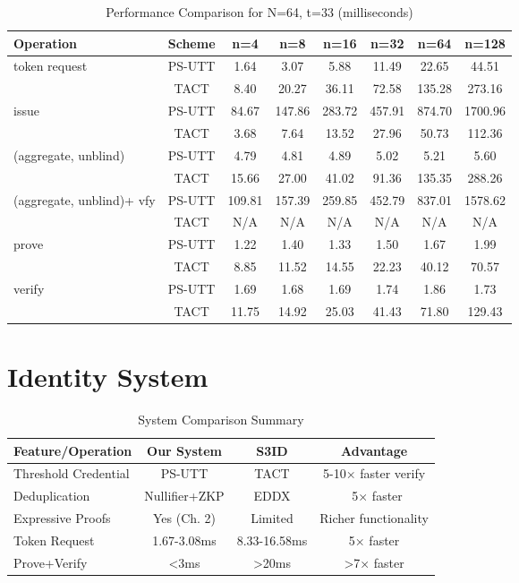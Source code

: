\begin{table}[htbp]
\centering
\caption{Performance Comparison for N=64, t=33 (milliseconds)}
\begin{tabular}{lccccccc}
\toprule
\textbf{Operation} & \textbf{Scheme} & \textbf{n=4} & \textbf{n=8} & \textbf{n=16} & \textbf{n=32} & \textbf{n=64} & \textbf{n=128} \\
\midrule
token request & PS-UTT & 1.64 & 3.07 & 5.88 & 11.49 & 22.65 & 44.51 \\
 & TACT & 8.40 & 20.27 & 36.11 & 72.58 & 135.28 & 273.16 \\
\midrule
issue & PS-UTT & 84.67 & 147.86 & 283.72 & 457.91 & 874.70 & 1700.96 \\
 & TACT & 3.68 & 7.64 & 13.52 & 27.96 & 50.73 & 112.36 \\
\midrule
(aggregate, unblind) & PS-UTT & 4.79 & 4.81 & 4.89 & 5.02 & 5.21 & 5.60 \\
 & TACT & 15.66 & 27.00 & 41.02 & 91.36 & 135.35 & 288.26 \\
\midrule
(aggregate, unblind)+ vfy & PS-UTT & 109.81 & 157.39 & 259.85 & 452.79 & 837.01 & 1578.62 \\
 & TACT & N/A & N/A & N/A & N/A & N/A & N/A \\
\midrule
prove & PS-UTT & 1.22 & 1.40 & 1.33 & 1.50 & 1.67 & 1.99 \\
 & TACT & 8.85 & 11.52 & 14.55 & 22.23 & 40.12 & 70.57 \\
\midrule
verify & PS-UTT & 1.69 & 1.68 & 1.69 & 1.74 & 1.86 & 1.73 \\
 & TACT & 11.75 & 14.92 & 25.03 & 41.43 & 71.80 & 129.43 \\
\bottomrule
\end{tabular}
\label{tab:perf-comp-64-33}
\end{table}




\section{Identity System}

\begin{table}[h]
\centering
\caption{System Comparison Summary}
\begin{tabular}{lccc}
\toprule
\textbf{Feature/Operation} & \textbf{Our System} & \textbf{S3ID} & \textbf{Advantage} \\
\midrule
Threshold Credential & PS-UTT & TACT & 5-10× faster verify \\
Deduplication & Nullifier+ZKP & EDDX & ~5× faster \\
Expressive Proofs & Yes (Ch. 2) & Limited & Richer functionality \\
Token Request & 1.67-3.08ms & 8.33-16.58ms & 5× faster \\
Prove+Verify & <3ms & >20ms & >7× faster \\
\bottomrule
\end{tabular}
\end{table}


